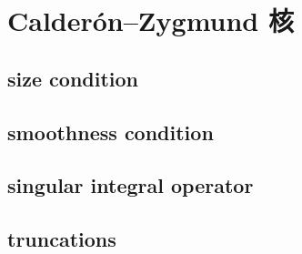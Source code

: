 \section{Calderón–Zygmund 核}
\label{b2:sec:1803}


\subsection{size condition}
\label{b2:subsec:180301}

\subsection{smoothness condition}
\label{b2:subsec:180302}

\subsection{singular integral operator}
\label{b2:subsec:180303}

\subsection{truncations}
\label{b2:subsec:180304}


